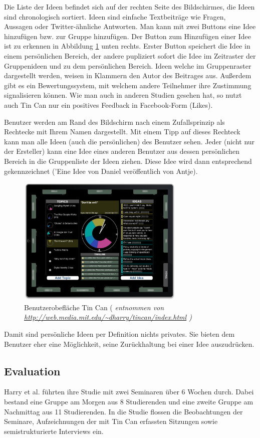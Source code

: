 Die Liste der Ideen befindet sich auf der rechten Seite des Bildschirmes, die
Ideen sind chronologisch sortiert. Ideen sind einfache Textbeiträge wie Fragen,
Aussagen oder Twitter-ähnliche Antworten. Man kann mit zwei Buttons eine Idee
hinzufügen bzw. zur Gruppe hinzufügen. Der Button zum Hinzufügen einer Idee ist
zu erkennen in Abbildung \ref{tincan_ui} unten rechts. Erster Button speichert 
die Idee in einem persönlichen Bereich, der andere pupliziert sofort die Idee
im Zeitraster der Gruppenideen und zu dem persönlichen Bereich. Ideen welche im
Gruppenraster dargestellt werden, weisen in Klammern den Autor des Beitrages 
aus. Außerdem gibt es ein Bewertungssystem, mit welchem andere Teilnehmer ihre
Zustimmung signalisieren können. Wie man auch in anderen Studien gesehen hat, so 
nutzt auch Tin Can nur ein positives Feedback in Facebook-Form (Likes).

Benutzer werden am Rand des Bildschirm nach einem Zufallsprinzip als Rechtecke
mit Ihrem Namen dargestellt. Mit einem Tipp auf dieses Rechteck kann man alle
Ideen (auch die persönlichen) des Benutzer sehen. Jeder (nicht nur der
Ersteller) kann eine Idee eines anderen Benutzer aus dessen persönlichen
Bereich in die Gruppenliste der Ideen ziehen. Diese Idee wird dann
entsprechend gekennzeichnet ('Eine Idee von Daniel veröffentlich von Antje).

\begin{figure}[htp]
\centering
\includegraphics[width=8cm]{tincan_ui.png}
\caption{Benutzerobefläche Tin Can ( \em {entnommen von \url {http://web.media.mit.edu/~dharry/tincan/index.html}} )}
\label{tincan_ui}
\end{figure}

Damit sind persönliche Ideen per Definition nichts privates. Sie bieten dem
Benutzer eher eine Möglichkeit, seine Zurückhaltung bei einer Idee auszudrücken.


\subsection{Evaluation}
Harry et al. \cite{HarGorSch2012} führten ihre Studie mit zwei Seminaren über 6 Wochen durch. Dabei
bestand eine Gruppe am Morgen aus 8 Studierenden und eine zweite Gruppe am
Nachmittag aus 11 Studierenden. In die Studie \cite{HarGorSch2012} flossen die Beobachtungen der
Seminare, Aufzeichnungen der mit Tin Can erfassten Sitzungen sowie
semistrukturierte Interviews ein.

